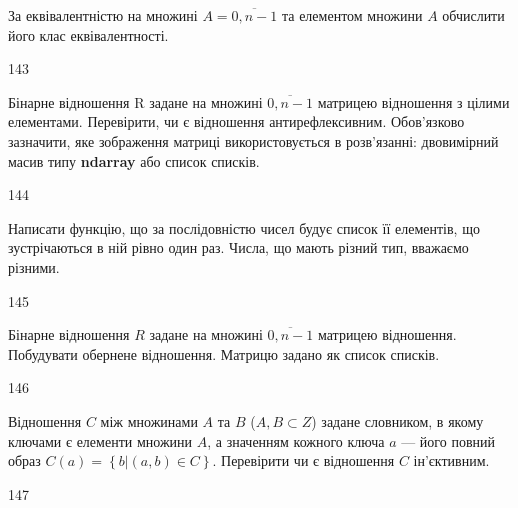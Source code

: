 За еквівалентністю на множині $A=\overline{0,n-1}$ та елементом множини $A$ обчислити його клас еквівалентності.
\\\par
143 














Бінарне відношення R задане на множині $\overline{0,n-1}$ матрицею відношення з цілими елементами.  Перевірити, чи є відношення антирефлексивним. Обов'язково зазначити, яке зображення матриці використовується в розв'язанні: двовимірний масив типу \textbf{ndarray} або список списків.
\\\par
144 














Написати функцію, що за послідовністю чисел будує список її елементів, що зустрічаються в ній рівно один раз. Числа, що мають різний тип, вважаємо різними.
\\\par
145 














Бінарне відношення $R$ задане на множині $\overline{0,n-1}$ матрицею відношення. Побудувати обернене відношення. Матрицю задано як список списків.
\\\par
146 














Відношення $C$ між множинами $A$ та $B$ ($A, B\subset Z$) задане словником, в якому ключами є елементи множини $A$, а значенням кожного ключа $a$ --- його повний образ $C\left(a\right)=\left\{b|\left(a,b\right)\in C\right\}$. Перевірити чи є відношення $C$ ін'єктивним.
\\\par
147 















